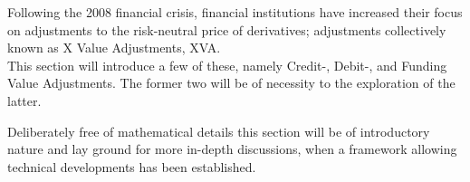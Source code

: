 \documentclass[main.tex]{subfiles}
\begin{document}
    Following the 2008 financial crisis,
    financial institutions have increased their focus on 
    adjustments to the risk-neutral price of derivatives;
    adjustments collectively known as X Value Adjustments, XVA. \\
    This section will introduce a few of these, 
    namely Credit-, Debit-, and Funding Value Adjustments.
    The former two will be of necessity to the exploration of the latter.

    Deliberately free of mathematical details this section will be of introductory nature 
    and lay ground for more in-depth discussions, 
    when a framework allowing technical developments has been established.
\end{document}
